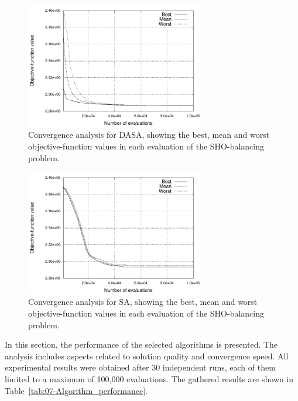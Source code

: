 \begin{figure}
\centering

\includegraphics[width=0.7\textwidth]{07-experimental_evaluation-sho_balancing/img/DASA_convergence}

\caption{Convergence analysis for DASA, showing the best, mean and worst objective-function
values in each evaluation of the SHO-balancing problem.\label{fig:07-Algorithm_convergence-DASA}}
\end{figure}


\begin{figure}
\centering

\includegraphics[width=0.7\textwidth]{07-experimental_evaluation-sho_balancing/img/SA_convergence}

\caption{Convergence analysis for SA, showing the best, mean and worst objective-function
values in each evaluation of the SHO-balancing problem.\label{fig:07-Algorithm_convergence-SA}}
\end{figure}


\noindent In this section, the performance of the selected algorithms
is presented. The analysis includes aspects related to solution quality
and convergence speed. All experimental results were obtained after
30 independent runs, each of them limited to a maximum of 100,000
evaluations. The gathered results are shown in Table~\ref{tab:07-Algorithm_performance}.

